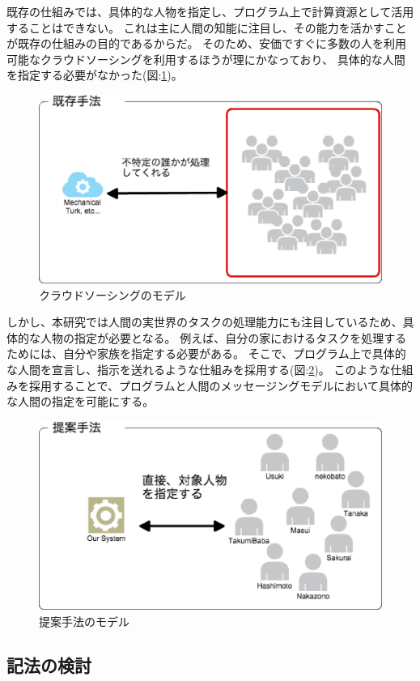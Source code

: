 既存の仕組みでは、具体的な人物を指定し、プログラム上で計算資源として活用することはできない。
これは主に人間の知能に注目し、その能力を活かすことが既存の仕組みの目的であるからだ。
そのため、安価ですぐに多数の人を利用可能なクラウドソーシングを利用するほうが理にかなっており、
具体的な人間を指定する必要がなかった(図:\ref{fig:crowdsourcing_model})。

\begin{figure}[htbp]
  \begin{center}
  \includegraphics[width=.5\linewidth]{images/crowdsourcing_model.eps}
  \end{center}
  \caption{クラウドソーシングのモデル}
  \label{fig:crowdsourcing_model}
\end{figure}

しかし、本研究では人間の実世界のタスクの処理能力にも注目しているため、具体的な人物の指定が必要となる。
例えば、自分の家におけるタスクを処理するためには、自分や家族を指定する必要がある。
そこで、プログラム上で具体的な人間を宣言し、指示を送れるような仕組みを採用する(図:\ref{fig:unique_id_model})。
このような仕組みを採用することで、プログラムと人間のメッセージングモデルにおいて具体的な人間の指定を可能にする。

\begin{figure}[htbp]
  \begin{center}
  \includegraphics[width=.5\linewidth]{images/unique_id_model.eps}
  \end{center}
  \caption{提案手法のモデル}
  \label{fig:unique_id_model}
\end{figure}

\subsection{記法の検討}\label{ux8a18ux6cd5ux306eux691cux8a0e}

